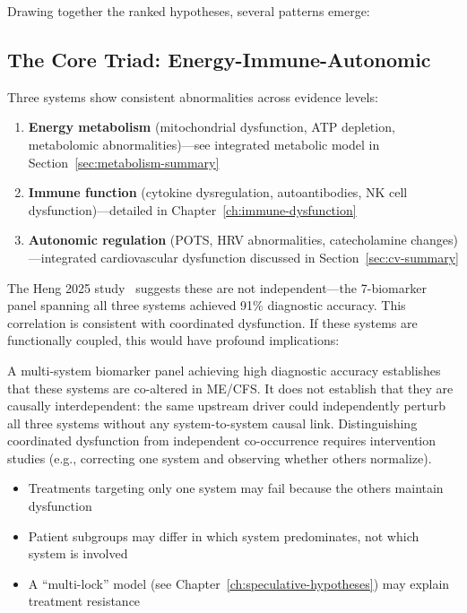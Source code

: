 Drawing together the ranked hypotheses, several patterns emerge:

\subsection{The Core Triad: Energy-Immune-Autonomic}

Three systems show consistent abnormalities across evidence levels:

\begin{enumerate}
    \item \textbf{Energy metabolism} (mitochondrial dysfunction, ATP depletion, metabolomic abnormalities)---see integrated metabolic model in Section~\ref{sec:metabolism-summary}
    \item \textbf{Immune function} (cytokine dysregulation, autoantibodies, NK cell dysfunction)---detailed in Chapter~\ref{ch:immune-dysfunction}
    \item \textbf{Autonomic regulation} (POTS, HRV abnormalities, catecholamine changes)---integrated cardiovascular dysfunction discussed in Section~\ref{sec:cv-summary}
\end{enumerate}

The Heng 2025 study~\cite{heng2025mecfs} suggests these are not independent---the 7-biomarker panel spanning all three systems achieved 91\% diagnostic accuracy. This correlation is consistent with coordinated dysfunction. If these systems are functionally coupled, this would have profound implications:

\begin{limitation}
A multi-system biomarker panel achieving high diagnostic accuracy establishes that these systems are co-altered in ME/CFS. It does not establish that they are causally interdependent: the same upstream driver could independently perturb all three systems without any system-to-system causal link. Distinguishing coordinated dysfunction from independent co-occurrence requires intervention studies (e.g., correcting one system and observing whether others normalize).
\end{limitation}

\begin{itemize}
    \item Treatments targeting only one system may fail because the others maintain dysfunction
    \item Patient subgroups may differ in which system predominates, not which system is involved
    \item A ``multi-lock'' model (see Chapter~\ref{ch:speculative-hypotheses}) may explain treatment resistance
\end{itemize}

